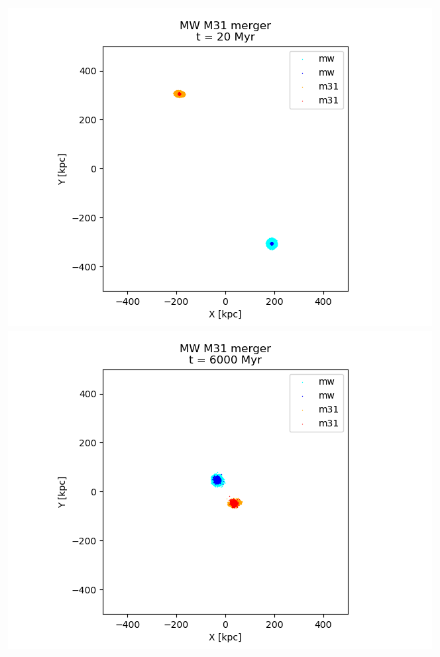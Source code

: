 \documentclass[a4paper,12pt, english]{article}
\begin{document}
\begin{figure}[!h]
\centering
\begin{minipage}{0.48\textwidth}
  \centering
\includegraphics[width=1\textwidth]{simulations-plots/merger_snapshots/mw_m31_diskbulge_merger_0001.png}
\end{minipage}
\begin{minipage}{0.48\textwidth}
  \centering
\includegraphics[width=1\textwidth]{simulations-plots/merger_snapshots/mw_m31_diskbulge_merger_0300.png}
\end{minipage}
\begin{minipage}{0.48\textwidth}
  \centering

\end{minipage}
\end{figure}
\end{document}
